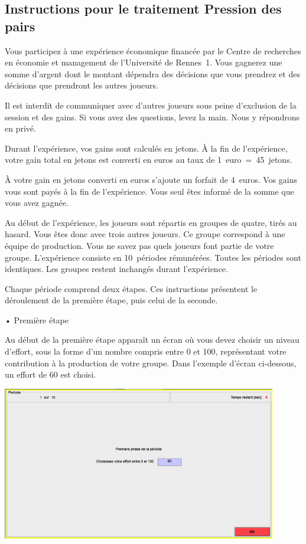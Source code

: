 \begin{Article}
\begin{refsection}[Lebourges]
\begin{appendices}
\subsection{Instructions pour le traitement Pression des pairs}

Vous participez à une expérience économique financée par le Centre de
recherches en économie et management de l'Université de Rennes~1. Vous
gagnerez une somme d'argent dont le montant dépendra des décisions que
vous prendrez et des décisions que prendront les autres joueurs.

Il est interdit de communiquer avec d'autres joueurs sous peine
d'exclusion de la session et des gains. Si vous avez des questions,
levez la main. Nous y répondrons en privé.

Durant l'expérience, vos gains sont calculés en jetons. À la fin de
l'expérience, votre gain total en jetons est converti en euros au taux
de 1~euro~=~45~jetons.

À votre gain en jetons converti en euros s'ajoute un forfait de 4~euros.
Vos gains vous sont payés à la fin de l'expérience. Vous seul êtes
informé de la somme que vous avez gagnée.

Au début de l'expérience, les joueurs sont répartis en groupes de
quatre, tirés au hasard. Vous êtes donc avec trois autres joueurs. Ce
groupe correspond à une équipe de production. Vous ne savez pas quels
joueurs font partie de votre groupe. L'expérience consiste en
10~périodes rémunérées. Toutes les périodes sont identiques. Les groupes
restent inchangés durant l'expérience.

Chaque période comprend deux étapes. Ces instructions présentent le
déroulement de la première étape, puis celui de la seconde.
\vspace{0,2cm}

• Première étape

\vspace{0,2cm}
Au début de la première étape apparaît un écran où vous devez choisir un
niveau d'effort, sous la forme d'un nombre compris entre 0 et 100,
représentant votre contribution à la production de votre groupe. Dans
l'exemple d'écran ci-dessous, un effort de 60 est choisi.

\vspace{0,2cm}

\includegraphics[width = 0.9\textwidth]{05_fig4-annexII.png}


\end{appendices}
\end{refsection}
\end{Article}
